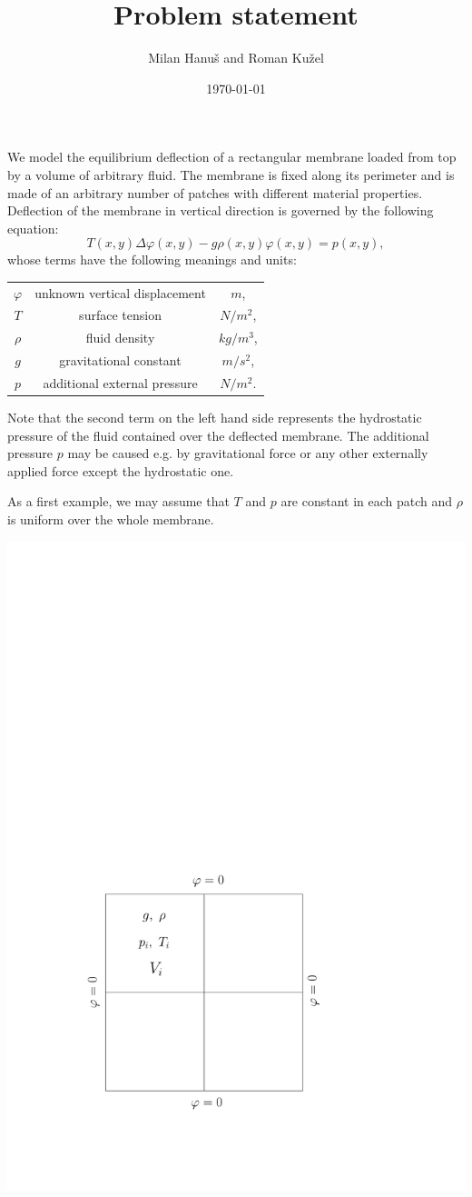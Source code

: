 \documentclass{article}
\title{Problem statement}
\author{Milan Hanu{\v s} and Roman Ku{\v z}el}
\date{\today}
\newcommand{\lapl}{\ensuremath{\Delta}}
\begin{document}
\maketitle
  We model the equilibrium deflection of a rectangular membrane loaded from top by a volume of arbitrary fluid. The membrane is fixed along its perimeter and is made of an arbitrary number of patches with different material properties. Deflection of the membrane in vertical direction is governed by the following equation:
$$  
T(x,y)\lapl\varphi(x,y) - g\rho(x,y)\varphi(x,y) = p(x,y),
$$
whose terms have the following meanings and units: 
\begin{center}
   \begin{tabular}{ccc}
  		$\varphi$ & unknown vertical displacement & $m$, \\
  		$T$ & surface tension & $N/m^2$,   \\
  		$\rho$ & fluid density & $kg/m^3$, \\
  		$g$ & gravitational constant & $m/s^2$, \\
  		$p$ & additional external pressure & $N/m^2$.
  \end{tabular}
\end{center}
Note that the second term on the left hand side represents the hydrostatic pressure of the fluid contained over the deflected membrane. The additional pressure $p$ may be caused e.g. by gravitational force or any other externally applied force except the hydrostatic one.\par
As a first example, we may assume that $T$ and $p$ are constant in each patch and $\rho$ is uniform over the whole membrane.\vspace{.2em}
\begin{center}
	\includegraphics[scale=0.6]{geometry}
	\label{fig:geometry}
\end{center}
\end{document}

